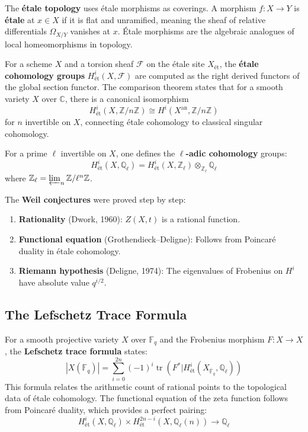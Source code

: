 The \textbf{étale topology} uses étale morphisms as coverings. A morphism
$f: X \to Y$ is \textbf{étale} at $x \in X$ if it is flat and unramified,
meaning the sheaf of relative differentials $\Omega_{X/Y}$ vanishes at $x$.
Étale morphisms are the algebraic analogues of local homeomorphisms in
topology.

For a scheme $X$ and a torsion sheaf $\mathcal{F}$ on the étale site $X_{\text{ét}}$,
the \textbf{étale cohomology groups} $H^i_{\text{ét}}(X, \mathcal{F})$ are
computed as the right derived functors of the global section functor. The
comparison theorem states that for a smooth variety $X$ over $\mathbb{C}$,
there is a canonical isomorphism
\[
H^i_{\text{ét}}(X, \mathbb{Z}/n\mathbb{Z}) \cong H^i(X^{\text{an}}, \mathbb{Z}/n\mathbb{Z})
\]
for $n$ invertible on $X$, connecting étale cohomology to classical singular
cohomology.

For a prime $\ell$ invertible on $X$, one defines the \textbf{$\ell$-adic
cohomology} groups:
\[
H^i_{\text{ét}}(X, \mathbb{Q}_\ell) = H^i_{\text{ét}}(X, \mathbb{Z}_\ell) \otimes_{\mathbb{Z}_\ell} \mathbb{Q}_\ell
\]
where $\mathbb{Z}_\ell = \varprojlim_n \mathbb{Z}/\ell^n\mathbb{Z}$.

The \textbf{Weil conjectures} were proved step by step:
\begin{enumerate}
\item \textbf{Rationality} (Dwork, 1960): $Z(X,t)$ is a rational function.
\item \textbf{Functional equation} (Grothendieck--Deligne): Follows from
Poincaré duality in étale cohomology.
\item \textbf{Riemann hypothesis} (Deligne, 1974): The eigenvalues of
Frobenius on $H^i$ have absolute value $q^{i/2}$.
\end{enumerate}

\subsection*{The Lefschetz Trace Formula}

For a smooth projective variety $X$ over $\mathbb{F}_q$ and the Frobenius
morphism $F: X \to X$, the \textbf{Lefschetz trace formula} states:
\[
|X(\mathbb{F}_q)| = \sum_{i=0}^{2n} (-1)^i \operatorname{tr}\left(F^* | H^i_{\text{ét}}(X_{\overline{\mathbb{F}}_q}, \mathbb{Q}_\ell)\right)
\]
This formula relates the arithmetic count of rational points to the
topological data of étale cohomology. The functional equation of the zeta
function follows from Poincaré duality, which provides a perfect pairing:
\[
H^i_{\text{ét}}(X, \mathbb{Q}_\ell) \times H^{2n-i}_{\text{ét}}(X, \mathbb{Q}_\ell(n)) \to \mathbb{Q}_\ell
\]

